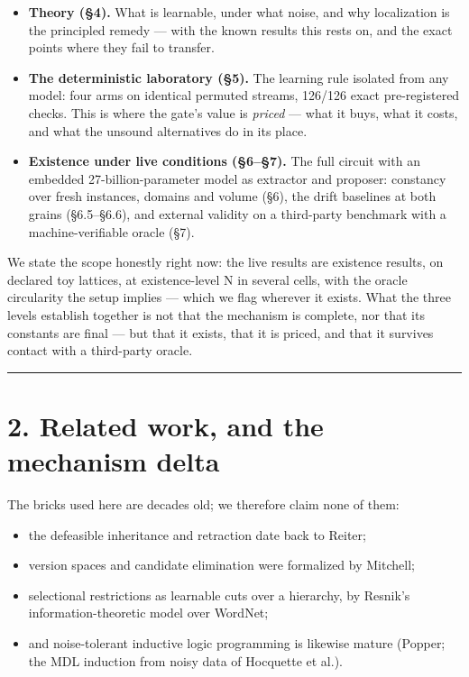 \documentclass[11pt]{article}
\begin{document}
\begin{itemize}
\item \textbf{Theory (§4).} What is learnable, under what noise, and why localization is the principled remedy — with the known results this rests on, and the exact points where they fail to transfer.
\item \textbf{The deterministic laboratory (§5).} The learning rule isolated from any model: four arms on identical permuted streams, 126/126 exact pre-registered checks. This is where the gate's value is \emph{priced} — what it buys, what it costs, and what the unsound alternatives do in its place.
\item \textbf{Existence under live conditions (§6–§7).} The full circuit with an embedded 27-billion-parameter model as extractor and proposer: constancy over fresh instances, domains and volume (§6), the drift baselines at both grains (§6.5–§6.6), and external validity on a third-party benchmark with a machine-verifiable oracle (§7).
\end{itemize}

We state the scope honestly right now: the live results are existence results, on declared toy lattices, at existence-level N in several cells, with the oracle circularity the setup implies — which we flag wherever it exists. What the three levels establish together is not that the mechanism is complete, nor that its constants are final — but that it exists, that it is priced, and that it survives contact with a third-party oracle.

\medskip\hrule\medskip

\section*{2. Related work, and the mechanism delta}

The bricks used here are decades old; we therefore claim none of them:

\begin{itemize}
\item the defeasible inheritance and retraction date back to Reiter;
\item version spaces and candidate elimination were formalized by Mitchell;
\item selectional restrictions as learnable cuts over a hierarchy, by Resnik's information-theoretic model over WordNet;
\item and noise-tolerant inductive logic programming is likewise mature (Popper; the MDL induction from noisy data of Hocquette et al.).
\end{itemize}
\end{document}
